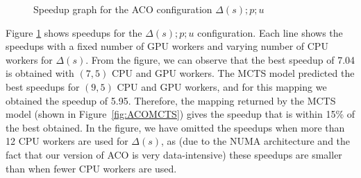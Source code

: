 \documentclass[smallextended]{svjour3}
\begin{document}
\begin{figure}
\begin{center}
\caption{Speedup graph for the ACO configuration
  $\Delta(s) ; p ; u$}
\label{fig:acver1}
\end{center}
\end{figure}

Figure \ref{fig:acver1} shows speedups for the $\Delta(s) ; p ; u$
configuration. Each line shows the speedups with a fixed number of GPU
workers and varying number of CPU workers for $\Delta(s)$. From the
figure, we can observe that the best speedup of 7.04 is obtained with
$(7,5)$ CPU and GPU workers. The MCTS model predicted the best
speedups for $(9,5)$ CPU and GPU workers, and for this mapping we
obtained the speedup of 5.95. Therefore, the mapping returned by the
MCTS model (shown in Figure~\ref{fig:ACOMCTS}) gives the speedup that is within 15\% of the best
obtained. In the figure, we have omitted the speedups when more than
12 CPU workers are used for $\Delta(s)$, as (due to the NUMA architecture
and the fact that our version of ACO is very data-intensive) these
speedups are smaller than when fewer CPU workers are used.
%
\end{document}
